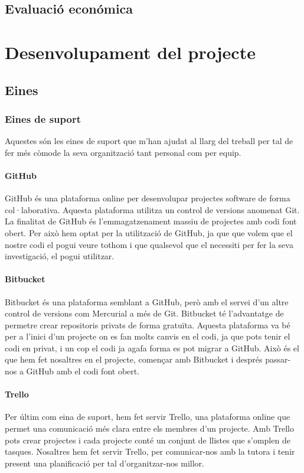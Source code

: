 \documentclass[11pt,a4paper,catalan]{article}
\begin{document}
\subsection{Evaluació económica}
\newpage

\section{Desenvolupament del projecte}
\subsection{Eines}
\subsubsection{Eines de suport}
Aquestes són les eines de suport que m'han ajudat al llarg del treball per tal de fer més còmode la seva organització tant personal com per equip.

\paragraph{GitHub}
GitHub és una plataforma online per desenvolupar projectes software de forma col·laborativa. Aquesta plataforma utilitza un control de versions anomenat Git. La finalitat de GitHub és l'emmagatzenament massiu de projectes amb codi font obert. Per això hem optat per la utilització de GitHub, ja que que volem que el nostre codi el pogui veure tothom i que qualsevol que el necessiti per fer la seva investigació, el pogui utilitzar.

\paragraph{Bitbucket}
Bitbucket és una plataforma semblant a GitHub, però amb el servei d'un altre control de versions com Mercurial a més de Git. Bitbucket té l'advantatge de permetre crear repositoris privats de forma gratuïta. Aquesta plataforma va bé per a l'inici d'un projecte on es fan molts canvis en el codi, ja que pots tenir el codi en privat, i un cop el codi ja agafa forma es pot migrar a GitHub. Això és el que hem fet nosaltres en el projecte, començar amb Bitbucket i després passar-nos a GitHub amb el codi font obert.

\paragraph{Trello}
Per últim com eina de suport, hem fet servir Trello, una plataforma online que permet una comunicació més clara entre els membres d'un projecte. Amb Trello pots crear projectes i cada projecte conté un conjunt de llistes que s'omplen de tasques. Nosaltres hem fet servir Trello, per comunicar-nos amb la tutora i tenir present una planificació per tal d'organitzar-nos millor.
\end{document}

